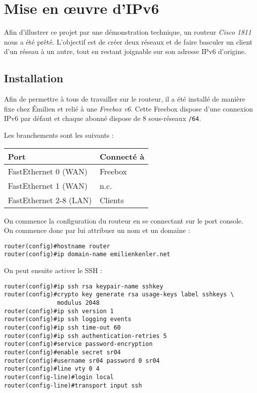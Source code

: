 \section{Mise en œuvre d'IPv6}

Afin d'illustrer ce projet par une démonstration technique, un routeur \emph{Cisco 1811} nous a été prêté. L'objectif est de créer deux réseaux et de faire basculer un client d'un réseau à un autre, tout en restant joignable sur son adresse IPv6 d'origine.

\subsection{Installation}

Afin de permettre à tous de travailler sur le routeur, il a été installé de manière fixe chez Émilien et relié à une \emph{Freebox v6}.
Cette Freebox dispose d'une connexion IPv6 par défaut et chaque abonné dispose de 8 sous-réseaux \texttt{/64}.

Les branchements sont les suivants :
\begin{center}
    \begin{tabular}{|l|l|}
    \hline
    Port                   & Connecté à \\ \hline
    FastEthernet 0 (WAN)   & Freebox    \\ \hline
    FastEthernet 1 (WAN)   & n.c.       \\ \hline
    FastEthernet 2-8 (LAN) & Clients    \\ \hline
    \end{tabular}
\end{center}

On commence la configuration du routeur en se connectant sur le port console. On commence donc par lui attribuer un nom et un domaine :

\begin{lstlisting}
router(config)#hostname router
router(config)#ip domain-name emilienkenler.net
\end{lstlisting}

On peut ensuite activer le SSH :

\begin{lstlisting}
router(config)#ip ssh rsa keypair-name sshkey
router(config)#crypto key generate rsa usage-keys label sshkeys \
               modulus 2048
router(config)#ip ssh version 1
router(config)#ip ssh logging events
router(config)#ip ssh time-out 60
router(config)#ip ssh authentication-retries 5
router(config)#service password-encryption
router(config)#enable secret sr04
router(config)#username sr04 password 0 sr04
router(config)#line vty 0 4
router(config-line)#login local
router(config-line)#transport input ssh
\end{lstlisting}

